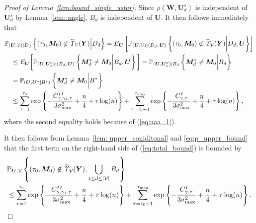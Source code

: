 \documentclass[12pt]{article}
\theoremstyle{shortspace}
\def\*#1{\bm{#1}}
\def\P{\mathbb P}
\begin{document}
\begin{proof}[Proof of Lemma~\ref{lem:bound_single_ustar}]
Since $\rho(\*W, \*U_d^s)$ is independent of $\*U_d^s$ by Lemma~\ref{lem::angle}, $B_d$ is independent of $\*U.$ It then follows immediately that 
\begin{align}
\label{eq:p_upper_bound}
    & \P_{(\*U,\mathcal V) | D_d}\left\{(\tau_0, \*M_0) \not\in \widehat{\it \Upsilon}_{{\mathcal V}}(\*Y) \middle| D_d\right\} =  E_{\*U}\left[\P_{(\*U,\mathcal V) | (D_d, \, \*U)}\left\{(\tau_0, \*M_0) \not\in \widehat{\it \Upsilon}_{{\mathcal V}}(\*Y) \bigg| D_d,  \*U\right\} \right]\nonumber\\
    & \quad \leq E_{\*U}\bigg[ \P_{(\*U,\*U_s^d) | (B_d, \, \*U)}\left\{ \*M^*_{d}  \neq \*M_0  \bigg| B_d,  \*U\right\} \bigg]  = \P_{(\*U,\*U_s^d) | B_d }\left\{ \*M^*_{d}  \neq \*M_0  \bigg| B_d\right\}\nonumber \\
   & \quad = \P_{(\*U,\*U^* | B^*)} \left\{ \*M_d^*  \neq \*M_0  \bigg| B^*\right\} \nonumber \\
   & \quad  \leq \sum_{\tau=1}^{\tau_0} \exp\left\{-\frac{C^{II}_{\gamma, \gamma_1, \tau}}{3\sigma^2_{\max}}  + \frac{n}4 + \tau\log(n)\right\} + \sum^{\tau_{\max}}_{\tau=\tau_0+1}
    \exp\left\{-\frac{C^I_{\gamma, \tau}}{3\sigma^2_{\max}} + \frac{n}4 +  \tau\log(n) \right\},
\end{align}
where the second equality holds because of (\ref{eq:aaa_1}).



 It then follows from Lemma~\ref{lem: upper_coniditonal} and \eqref{eq:p_upper_bound} that the first term  on the right-hand side of (\ref{eq:total_bound}) is bounded by  
\begin{align}
    & \P_{\*U,\mathcal V  }\left\{(\tau_0, \*M_0) \not\in \widehat{\it \Upsilon}_{{\mathcal V}}(\*Y), \bigcup_{ 1 \leq d \leq |\mathcal V|}
    B_d \right\}  \nonumber\\
     &\leq \sum_{\tau=1}^{\tau_0} \exp\left\{-\frac{C^{II}_{\gamma, \gamma_1, \tau}}{3\sigma^2_{\max}}  + \frac{n}4 + \tau\log(n)\right\} + \sum^{\tau_{\max}}_{\tau=\tau_0+1}
    \exp\left\{-\frac{C^I_{\gamma, \tau}}{3\sigma^2_{\max}} + \frac{n}4 +  \tau\log(n) \right\}.
\label{eq:inequality_single}
\end{align}



\end{proof}
\end{document}
